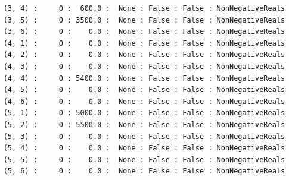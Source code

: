 \documentclass[12pt]{article}
\begin{document}
\begin{verbatim}
    (3, 4) :     0 :  600.0 :  None : False : False : NonNegativeReals
    (3, 5) :     0 : 3500.0 :  None : False : False : NonNegativeReals
    (3, 6) :     0 :    0.0 :  None : False : False : NonNegativeReals
    (4, 1) :     0 :    0.0 :  None : False : False : NonNegativeReals
    (4, 2) :     0 :    0.0 :  None : False : False : NonNegativeReals
    (4, 3) :     0 :    0.0 :  None : False : False : NonNegativeReals
    (4, 4) :     0 : 5400.0 :  None : False : False : NonNegativeReals
    (4, 5) :     0 :    0.0 :  None : False : False : NonNegativeReals
    (4, 6) :     0 :    0.0 :  None : False : False : NonNegativeReals
    (5, 1) :     0 : 5000.0 :  None : False : False : NonNegativeReals
    (5, 2) :     0 : 5500.0 :  None : False : False : NonNegativeReals
    (5, 3) :     0 :    0.0 :  None : False : False : NonNegativeReals
    (5, 4) :     0 :    0.0 :  None : False : False : NonNegativeReals
    (5, 5) :     0 :    0.0 :  None : False : False : NonNegativeReals
    (5, 6) :     0 :    0.0 :  None : False : False : NonNegativeReals
\end{verbatim}
\end{document}
